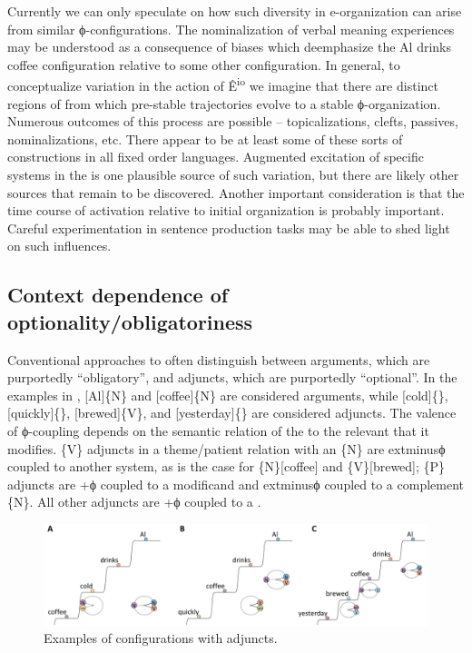   Currently we can only speculate on how such diversity in e-organization can arise from similar ϕ-con\-fig\-u\-ra\-tions. The nominalization of verbal meaning experiences may be understood as a consequence of  biases which deemphasize the {\textbar}Al drinks coffee{\textbar} configuration relative to some other configuration. In general, to conceptualize variation in the action of Ê\textsuperscript{io} we imagine that there are distinct regions of  from which pre-stable trajectories evolve to a stable ϕ-organization. Numerous outcomes of this process are possible -- topicalizations, clefts, passives, nominalizations, etc. There appear to be at least some of these sorts of constructions in all fixed order languages. Augmented excitation of specific systems in the  is one plausible source of such variation, but there are likely other sources that remain to be discovered. Another important consideration is that the time course of activation relative to initial organization is probably important. Careful experimentation in sentence production tasks may be able to shed light on such influences.

\subsection{Context dependence of optionality/obligatoriness}

Conventional approaches to  often distinguish between arguments, which are purportedly “obligatory”, and adjuncts, which are purportedly “optional”. In the examples in {}, [Al]\{N\} and [coffee]\{N\} are considered arguments, while [cold]\{\}, [quickly]\{\}, [brewed]\{V\}, and [yesterday]\{\} are considered adjuncts. The valence of  ϕ-coupling depends on the semantic relation of the  to the relevant  that it modifies. \{V\} adjuncts in a theme/patient relation with an \{N\} are 	extminus{}ϕ coupled to another system, as is the case for \{N\}[coffee] and \{V\}[brewed]; \{P\} adjuncts are +ϕ coupled to a modificand and 	extminus{}ϕ coupled to a complement \{N\}. All other adjuncts are +ϕ coupled to a .

  
\begin{figure}
\includegraphics[width=\textwidth]{figures/Tilsen-img83.png}
\caption{Examples of configurations with adjuncts.}
\label{fig:4:33}
\end{figure}
 

